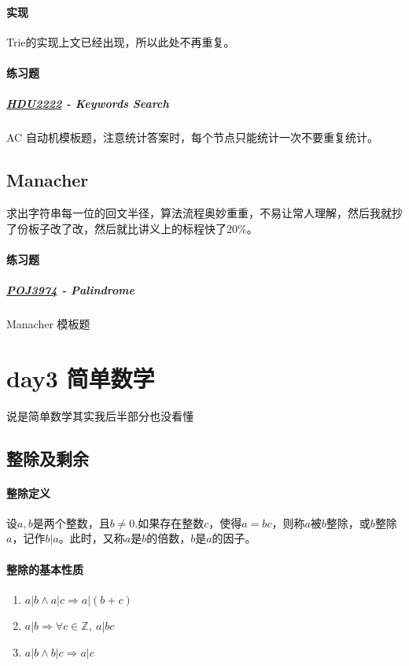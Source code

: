 \documentclass[]{cpp}
\begin{document}
\paragraph{实现}
	Trie的实现上文已经出现，所以此处不再重复。
\paragraph{练习题}
\subparagraph{\href{http://acm.hdu.edu.cn/showproblem.php?pid=2222}{HDU2222} - Keywords Search}
AC 自动机模板题，注意统计答案时，每个节点只能统计一次不要重复统计。
\subsection{Manacher}
求出字符串每一位的回文半径，算法流程奥妙重重，不易让常人理解，然后我就抄了份板子改了改，然后就比讲义上的标程快了$20\%$。
\paragraph{练习题}
\subparagraph{\href{http://poj.org/problem?id=3974}{POJ3974} - Palindrome}
Manacher 模板题
\section{day3 简单数学}
说是简单数学其实我后半部分也没看懂\\
\subsection{整除及剩余}
\paragraph{整除定义}
	设$a,b$是两个整数，且$b\neq0$.如果存在整数$c$，使得$a=bc$，则称$a$被$b$整除，或$b$整除$a$，记作$b|a$。此时，又称$a$是$b$的倍数，$b$是$a$的因子。
\paragraph{整除的基本性质}
	\begin{enumerate}
		\item $a|b \land a|c \Rightarrow a|(b+c)$
		\item $a|b \Rightarrow \forall c\in\mathbb{Z},\ a|bc$
		\item $a|b \land b|c \Rightarrow a|c$
	\end{enumerate}
\end{document}
